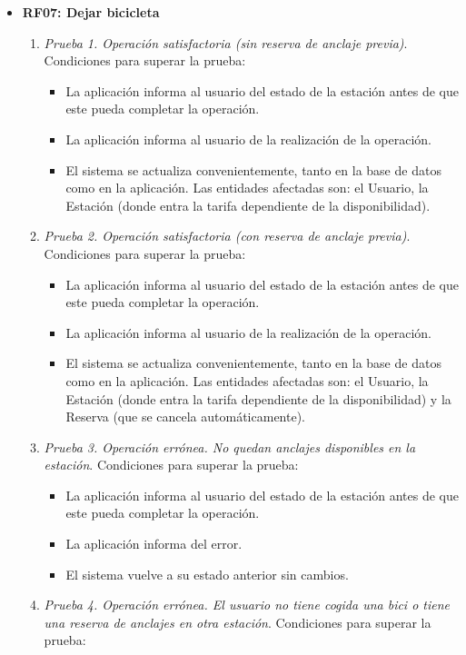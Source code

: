 \begin{itemize}
	\item \textbf{RF07: Dejar bicicleta}
	\begin{enumerate}
		\item \textit{Prueba 1. Operación satisfactoria (sin reserva de anclaje previa)}. Condiciones para superar la prueba:
		\begin{itemize}
			\item La aplicación informa al usuario del estado de la estación antes de que este pueda completar la operación.
			\item La aplicación informa al usuario de la realización de la operación.
			\item El sistema se actualiza convenientemente, tanto en la base de datos como en la aplicación. Las entidades afectadas son: el Usuario, la Estación (donde entra la tarifa dependiente de la disponibilidad).
		\end{itemize}
		\item \textit{Prueba 2. Operación satisfactoria (con reserva de anclaje previa)}. Condiciones para superar la prueba:
		\begin{itemize}
			\item La aplicación informa al usuario del estado de la estación antes de que este pueda completar la operación.
			\item La aplicación informa al usuario de la realización de la operación.
			\item El sistema se actualiza convenientemente, tanto en la base de datos como en la aplicación. Las entidades afectadas son: el Usuario, la Estación (donde entra la tarifa dependiente de la disponibilidad) y la Reserva (que se cancela automáticamente).
		\end{itemize}
		\item \textit{Prueba 3. Operación errónea. No quedan anclajes disponibles en la estación}. Condiciones para superar la prueba:
		\begin{itemize}
			\item La aplicación informa al usuario del estado de la estación antes de que este pueda completar la operación.
			\item La aplicación informa del error.
			\item El sistema vuelve a su estado anterior sin cambios.
		\end{itemize}
		\item \textit{Prueba 4. Operación errónea. El usuario no tiene cogida una bici o tiene una reserva de anclajes en otra estación}. Condiciones para superar la prueba:

\end{enumerate}
\end{itemize}
